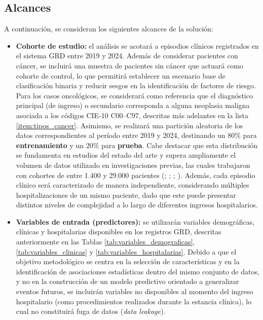 \subsection{Alcances}
A continuación, se consideran los siguientes alcances de la solución:

\begin{itemize}
\item \textbf{Cohorte de estudio:} el análisis se acotará a episodios clínicos registrados en el sistema GRD entre 2019 y 2024. Además de considerar pacientes con cáncer, se incluirá una muestra de pacientes sin cáncer que actuará como cohorte de control, lo que permitirá establecer un escenario base de clasificación binaria y reducir sesgos en la identificación de factores de riesgo. Para los casos oncológicos, se considerará como referencia que el diagnóstico principal (de ingreso) o secundario corresponda a alguna neoplasia maligna asociada a los códigos CIE-10 C00--C97, descritas más adelantes en la lista \ref{item:tipos_cancer}. Asimismo, se realizará una partición aleatoria de los datos correspondientes al período entre 2019 y 2024, destinando un 80\% para \textbf{entrenamiento} y un 20\% para \textbf{prueba}. Cabe destacar que esta distribución se fundamenta en estudios del estado del arte y supera ampliamente el volumen de datos utilizado en investigaciones previas, las cuales trabajaron con cohortes de entre 1.400 y 29.000 pacientes (\cite{article4}; \cite{article6}; \cite{article8}; \cite{article10}). Además, cada episodio clínico será caracterizado de manera independiente, considerando múltiples hospitalizaciones de un mismo paciente, dado que este puede presentar distintos niveles de complejidad a lo largo de diferentes ingresos hospitalarios.

\item \textbf{Variables de entrada (predictores):} se utilizarán variables demográficas, clínicas y hospitalarias disponibles en los registros GRD, descritas anteriormente en las Tablas \ref{tab:variables_demograficas}, \ref{tab:variables_clinicas} y \ref{tab:variables_hospitalarias}. Debido a que el objetivo metodológico se centra en la selección de características y en la identificación de asociaciones estadísticas dentro del mismo conjunto de datos, y no en la construcción de un modelo predictivo orientado a generalizar eventos futuros, se incluirán variables no disponibles al momento del ingreso hospitalario (como procedimientos realizados durante la estancia clínica), lo cual no constituirá fuga de datos (\textit{data leakage}).


\end{itemize}
